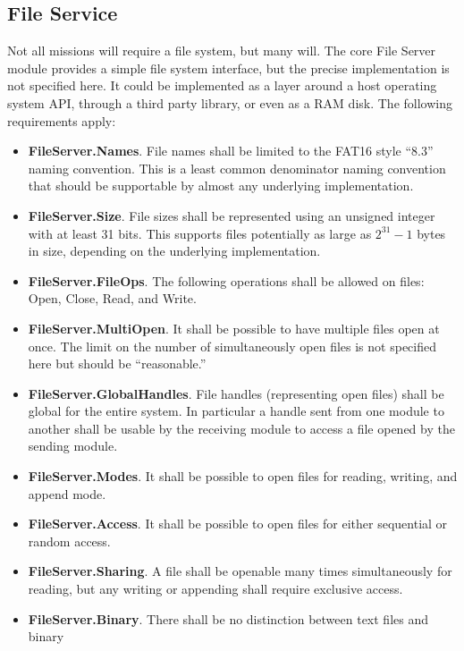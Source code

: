 \subsection{File Service}
\label{sec:file-service}

Not all missions will require a file system, but many will. The core File Server module provides
a simple file system interface, but the precise implementation is not specified here. It could
be implemented as a layer around a host operating system API, through a third party library, or
even as a RAM disk. The following requirements apply:

\begin{itemize}
\item \textbf{FileServer.Names}. File names shall be limited to the FAT16 style ``8.3'' naming
  convention. This is a least common denominator naming convention that should be supportable by
  almost any underlying implementation. 
\item \textbf{FileServer.Size}. File sizes shall be represented using an unsigned integer with
  at least 31 bits. This supports files potentially as large as $2^{31} - 1$ bytes in size,
  depending on the underlying implementation.
\item \textbf{FileServer.FileOps}. The following operations shall be allowed on files: Open,
  Close, Read, and Write.
\item \textbf{FileServer.MultiOpen}. It shall be possible to have multiple files open at once.
  The limit on the number of simultaneously open files is not specified here but should be
  ``reasonable.''
\item \textbf{FileServer.GlobalHandles}. File handles (representing open files) shall be global
  for the entire system. In particular a handle sent from one module to another shall be usable
  by the receiving module to access a file opened by the sending module.
\item \textbf{FileServer.Modes}. It shall be possible to open files for reading, writing, and
  append mode.
\item \textbf{FileServer.Access}. It shall be possible to open files for either sequential or
  random access.
\item \textbf{FileServer.Sharing}. A file shall be openable many times simultaneously for
  reading, but any writing or appending shall require exclusive access.
\item \textbf{FileServer.Binary}. There shall be no distinction between text files and binary

\end{itemize}
